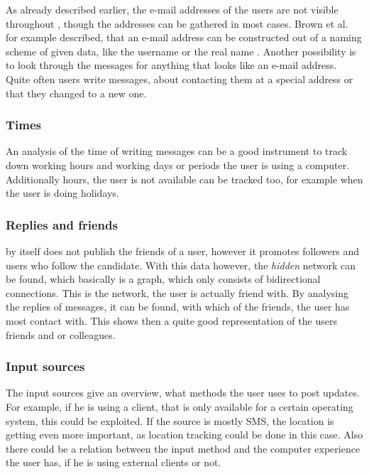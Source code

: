 As already described earlier, the e-mail addresses of the users are not visible
throughout \Twitter{}, though the addresses can be gathered in most cases.
Brown et al. for example described, that an e-mail address can be constructed out
of a naming scheme of given data, like the username or the real name
\cite{brown2008}. Another possibility is to look through the messages for
anything that looks like an e-mail address. Quite often users write messages,
about contacting them at a special address or that they changed to a new one.

\subsubsection{Times}

An analysis of the time of writing messages can be a good instrument to track
down working hours and working days or periods the user is using a computer.
Additionally hours, the user is not available can be tracked too, for example
when the user is doing holidays.

\subsubsection{Replies and friends}

\Twitter{} by itself does not publish the friends of a user, however it
promotes followers and users who follow the candidate. With this data however,
the \textit{hidden} network can be found, which basically is a graph, which
only consists of bidirectional connections. This is the network, the user is
actually friend with. By analysing the replies of messages, it can be found,
with which of the friends, the user has most contact with. This shows then a
quite good representation of the users friends and or colleagues.

\subsubsection{Input sources}

The \Twitter{} input sources give an overview, what methods the user uses to
post updates. For example, if he is using a \Twitter{} client, that is only
available for a certain operating system, this could be exploited. If the
source is mostly SMS, the location is getting even more important, as location
tracking could be done in this case. Also there could be a relation between the
input method and the computer experience the user has, if he is using external
clients or not.

